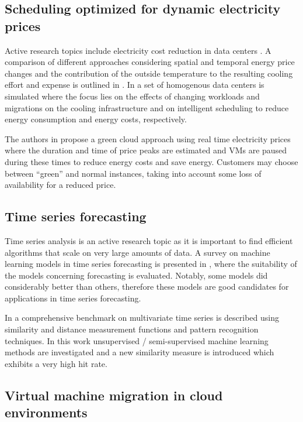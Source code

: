 \subsection{Scheduling optimized for dynamic electricity prices}

Active research topics include electricity cost reduction in data centers \cite{guler2013cutting, le2011reducing}. A comparison of different approaches considering spatial and temporal energy price changes and the contribution of the outside temperature to the resulting cooling effort and expense is outlined in \cite{guler2013cutting}. In \cite{le2011reducing} a set of homogenous data centers is simulated where the focus lies on the effects of changing workloads and migrations on the cooling infrastructure and on intelligent scheduling to reduce energy consumption and energy costs, respectively. 

The authors in \cite{lucanin2013take} propose a green cloud approach using real time electricity prices where the duration and time of price peaks are estimated and VMs are paused during these times to reduce energy costs and save energy. Customers may choose between ``green'' and normal instances, taking into account some loss of availability for a reduced price. 

\subsection{Time series forecasting}

Time series analysis is an active research topic as it is important to find efficient algorithms that scale on very large amounts of data. A survey on machine learning models in time series forecasting is presented in \cite{ahmed2010empirical}, where the suitability of the models concerning forecasting is evaluated. Notably, some models did considerably better than others, therefore these models are good candidates for applications in time series forecasting. 

In \cite{lin2012pattern} a comprehensive benchmark on multivariate time series is described using similarity and distance measurement functions and pattern recognition techniques. In this work unsupervised / semi-supervised machine learning methods are investigated and a new similarity measure is introduced which exhibits a very high hit rate. 

\subsection{Virtual machine migration in cloud environments}

